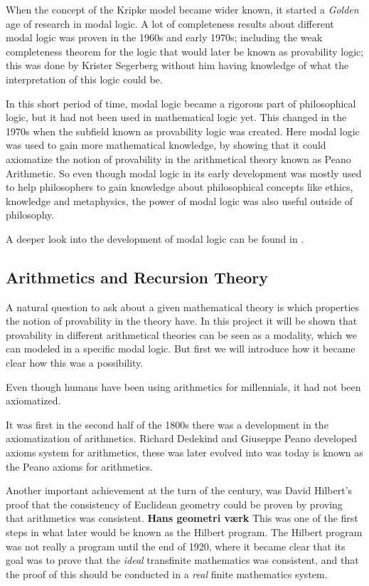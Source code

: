 \documentclass[../main.tex]{subfiles}
\begin{document}
When the concept of the Kripke model became wider known, it started a
\textit{Golden} age of research in modal logic. A lot of completeness results
about different modal logic was proven in the 1960s and early 1970s; including
the weak completeness theorem for the logic that would later be known as
provability logic; this was done by Krister Segerberg without him having
knowledge of what the interpretation of this logic could be.

In this short period of time, modal logic became a rigorous part of
philosophical logic, but it had not been used in mathematical logic yet. This
changed in the 1970s when the subfield known as provability logic was created.
Here modal logic was used to gain more mathematical knowledge, by showing that
it could axiomatize the notion of provability in the arithmetical theory known
as Peano Arithmetic. So even though modal logic in its early development was
mostly used to help philosophers to gain knowledge about philosophical concepts
like ethics, knowledge and metaphysics, the power of modal logic was also
useful outside of philosophy.

A deeper look into the development of modal logic can be found in
\parencite{Goldblatt2003}.
\subsection{Arithmetics and Recursion Theory}
A natural question to ask about a given mathematical theory is which properties
the notion of provability in the theory have. In this project it will be shown
that provability in different arithmetical theories  can be seen as a modality,
which we can modeled in a specific
modal logic. But first we will introduce how it became clear how this was a
possibility.

Even though humans have been using arithmetics for millennials, it had not been
axiomatized.

It was first in  the second half of the 1800s there was a development in the axiomatization
of arithmetics. Richard Dedekind and Giuseppe Peano developed axioms system for arithmetics,
these was later evolved into was today is known as the Peano axioms for
arithmetics. 

Another important achievement at the turn of the century, was David Hilbert's
proof that the consistency of Euclidean geometry could be proven by proving
that arithmetics was consistent. \textbf{Hans geometri værk} This was one of the first steps in what later
would be known as the Hilbert program. 
The Hilbert program was not really a program until the end of 1920, where it
became clear that its goal was to prove that the \textit{ideal} transfinite mathematics was
consistent, and that the proof of this should be conducted in a \textit{real}
finite mathematics system.
\end{document}
